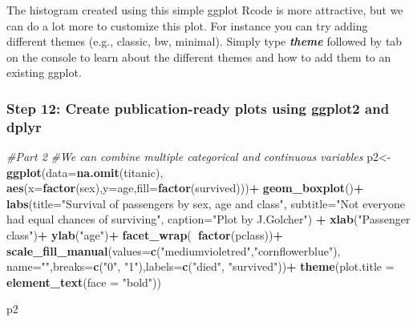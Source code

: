 \documentclass[]{article}
\newenvironment{Shaded}{\begin{snugshade}}{\end{snugshade}}
\newcommand{\CommentTok}[1]{\textcolor[rgb]{0.56,0.35,0.01}{\textit{#1}}}
\newcommand{\DataTypeTok}[1]{\textcolor[rgb]{0.13,0.29,0.53}{#1}}
\newcommand{\KeywordTok}[1]{\textcolor[rgb]{0.13,0.29,0.53}{\textbf{#1}}}
\newcommand{\NormalTok}[1]{#1}
\newcommand{\OperatorTok}[1]{\textcolor[rgb]{0.81,0.36,0.00}{\textbf{#1}}}
\newcommand{\StringTok}[1]{\textcolor[rgb]{0.31,0.60,0.02}{#1}}
\begin{document}
The histogram created using this simple ggplot Rcode is more attractive,
but we can do a lot more to customize this plot. For instance you can
try adding different themes (e.g., classic, bw, minimal). Simply type
\textbf{\emph{theme}} followed by tab on the console to learn about the
different themes and how to add them to an existing ggplot.

\hypertarget{step-12-create-publication-ready-plots-using-ggplot2-and-dplyr}{%
\subsubsection{Step 12: Create publication-ready plots using ggplot2 and
dplyr}\label{step-12-create-publication-ready-plots-using-ggplot2-and-dplyr}}

\begin{Shaded}
\begin{Highlighting}[]
\CommentTok{#Part 2}
\CommentTok{#We can combine multiple categorical and continuous variables}
\NormalTok{p2<-}\KeywordTok{ggplot}\NormalTok{(}\DataTypeTok{data=}\KeywordTok{na.omit}\NormalTok{(titanic),}
           \KeywordTok{aes}\NormalTok{(}\DataTypeTok{x=}\KeywordTok{factor}\NormalTok{(sex),}\DataTypeTok{y=}\NormalTok{age,}\DataTypeTok{fill=}\KeywordTok{factor}\NormalTok{(survived)))}\OperatorTok{+}
\StringTok{  }\KeywordTok{geom_boxplot}\NormalTok{()}\OperatorTok{+}
\StringTok{  }\KeywordTok{labs}\NormalTok{(}\DataTypeTok{title=}\StringTok{"Survival of passengers by sex, age and class"}\NormalTok{,}
       \DataTypeTok{subtitle=}\StringTok{"Not everyone had equal chances of surviving"}\NormalTok{, }
       \DataTypeTok{caption=}\StringTok{"Plot by J.Golcher"}\NormalTok{) }\OperatorTok{+}
\StringTok{  }\KeywordTok{xlab}\NormalTok{(}\StringTok{"Passenger class"}\NormalTok{)}\OperatorTok{+}
\StringTok{  }\KeywordTok{ylab}\NormalTok{(}\StringTok{"age"}\NormalTok{)}\OperatorTok{+}
\StringTok{  }\KeywordTok{facet_wrap}\NormalTok{(}\OperatorTok{~}\KeywordTok{factor}\NormalTok{(pclass))}\OperatorTok{+}
\StringTok{  }\KeywordTok{scale_fill_manual}\NormalTok{(}\DataTypeTok{values=}\KeywordTok{c}\NormalTok{(}\StringTok{"mediumvioletred"}\NormalTok{,}\StringTok{"cornflowerblue"}\NormalTok{),}
                    \DataTypeTok{name=}\StringTok{""}\NormalTok{,}\DataTypeTok{breaks=}\KeywordTok{c}\NormalTok{(}\StringTok{"0"}\NormalTok{, }\StringTok{"1"}\NormalTok{),}\DataTypeTok{labels=}\KeywordTok{c}\NormalTok{(}\StringTok{"died"}\NormalTok{, }\StringTok{"survived"}\NormalTok{))}\OperatorTok{+}
\StringTok{  }\KeywordTok{theme}\NormalTok{(}\DataTypeTok{plot.title =} \KeywordTok{element_text}\NormalTok{(}\DataTypeTok{face =} \StringTok{"bold"}\NormalTok{))}

\NormalTok{p2}
\end{Highlighting}
\end{Shaded}
\end{document}
